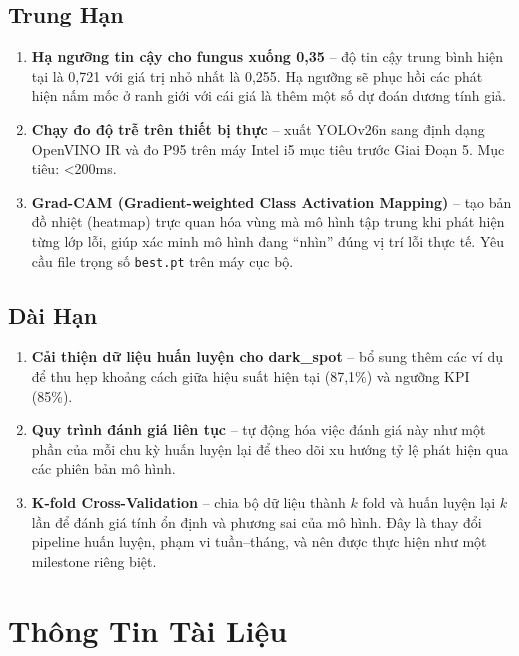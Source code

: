 \documentclass[12pt, a4paper]{article}
\begin{document}
\subsection{Trung Hạn}

\begin{enumerate}[leftmargin=1.5em, resume]
  \item \textbf{Hạ ngưỡng tin cậy cho fungus xuống 0,35} -- độ tin cậy trung bình hiện tại là 0,721 với giá trị nhỏ nhất là 0,255. Hạ ngưỡng sẽ phục hồi các phát hiện nấm mốc ở ranh giới với cái giá là thêm một số dự đoán dương tính giả.
  \item \textbf{Chạy đo độ trễ trên thiết bị thực} -- xuất YOLOv26n sang định dạng OpenVINO IR và đo P95 trên máy Intel i5 mục tiêu trước Giai Đoạn 5. Mục tiêu: \textless{}200ms.
  \item \textbf{Grad-CAM (Gradient-weighted Class Activation Mapping)} -- tạo bản đồ nhiệt (heatmap) trực quan hóa vùng mà mô hình tập trung khi phát hiện từng lớp lỗi, giúp xác minh mô hình đang ``nhìn'' đúng vị trí lỗi thực tế. Yêu cầu file trọng số \texttt{best.pt} trên máy cục bộ.
\end{enumerate}

\subsection{Dài Hạn}

\begin{enumerate}[leftmargin=1.5em, resume]
  \item \textbf{Cải thiện dữ liệu huấn luyện cho dark\_spot} -- bổ sung thêm các ví dụ để thu hẹp khoảng cách giữa hiệu suất hiện tại (87,1\%) và ngưỡng KPI (85\%).
  \item \textbf{Quy trình đánh giá liên tục} -- tự động hóa việc đánh giá này như một phần của mỗi chu kỳ huấn luyện lại để theo dõi xu hướng tỷ lệ phát hiện qua các phiên bản mô hình.
  \item \textbf{K-fold Cross-Validation} -- chia bộ dữ liệu thành $k$ fold và huấn luyện lại $k$ lần để đánh giá tính ổn định và phương sai của mô hình. Đây là thay đổi pipeline huấn luyện, phạm vi tuần--tháng, và nên được thực hiện như một milestone riêng biệt.
\end{enumerate}

\section*{Thông Tin Tài Liệu}
\end{document}
